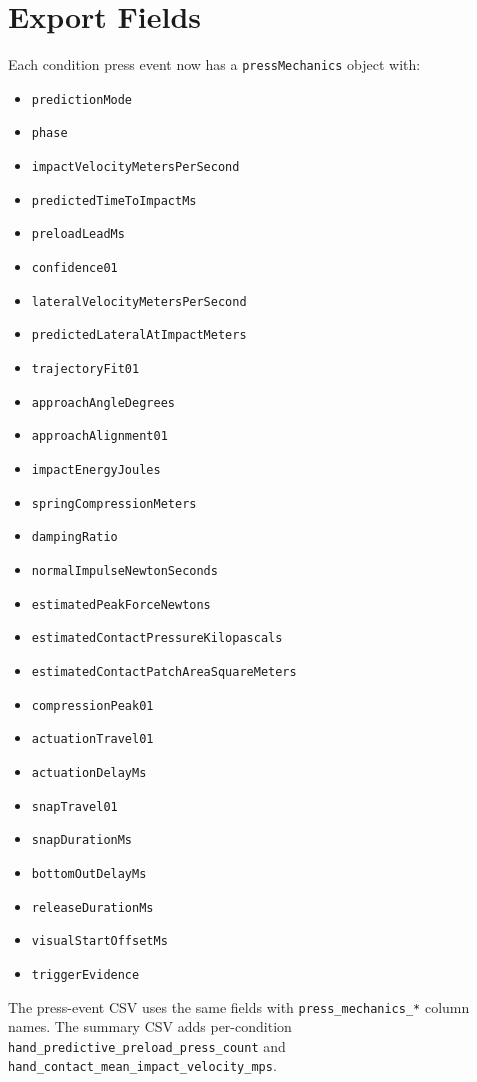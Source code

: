 \documentclass[11pt]{article}
\begin{document}
\section{Export Fields}
Each condition press event now has a \texttt{pressMechanics} object with:
\begin{itemize}
  \item \texttt{predictionMode}
  \item \texttt{phase}
  \item \texttt{impactVelocityMetersPerSecond}
  \item \texttt{predictedTimeToImpactMs}
  \item \texttt{preloadLeadMs}
  \item \texttt{confidence01}
  \item \texttt{lateralVelocityMetersPerSecond}
  \item \texttt{predictedLateralAtImpactMeters}
  \item \texttt{trajectoryFit01}
  \item \texttt{approachAngleDegrees}
  \item \texttt{approachAlignment01}
  \item \texttt{impactEnergyJoules}
  \item \texttt{springCompressionMeters}
  \item \texttt{dampingRatio}
  \item \texttt{normalImpulseNewtonSeconds}
  \item \texttt{estimatedPeakForceNewtons}
  \item \texttt{estimatedContactPressureKilopascals}
  \item \texttt{estimatedContactPatchAreaSquareMeters}
  \item \texttt{compressionPeak01}
  \item \texttt{actuationTravel01}
  \item \texttt{actuationDelayMs}
  \item \texttt{snapTravel01}
  \item \texttt{snapDurationMs}
  \item \texttt{bottomOutDelayMs}
  \item \texttt{releaseDurationMs}
  \item \texttt{visualStartOffsetMs}
  \item \texttt{triggerEvidence}
\end{itemize}
The press-event CSV uses the same fields with \texttt{press\_mechanics\_*} column names. The summary CSV adds per-condition \texttt{hand\_predictive\_preload\_press\_count} and \texttt{hand\_contact\_mean\_impact\_velocity\_mps}.
\end{document}
